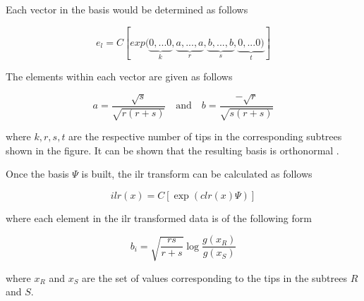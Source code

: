 Each vector in the basis would be determined as follows

\[e_l = C[exp( \underbrace{0,...0}_{k}, \underbrace{a,...,a}_{r},\underbrace{b,...,b}_s,\underbrace{0,...0)}_t]\]

The elements within each vector are given as follows

\[a = \frac{\sqrt{s}}{\sqrt{r(r+s)}} \quad \textrm{and} \quad b = \frac{-\sqrt{r}}{\sqrt{s(r+s)}}\]

where $k, r, s, t$ are the respective number of tips in the corresponding subtrees shown in the figure.  It can be shown that the resulting basis is orthonormal \cite{groups_of_parts}.

Once the basis $\Psi$ is built, the ilr transform can be calculated as follows

\[
ilr(x) = C[\exp(clr(x) \Psi)]
\]


where each element in the ilr transformed data is of the following form


\[
b_i = \sqrt{\frac{rs}{r+s}} \log \frac{g(x_R)}{g(x_S)}
\]

where $ x_R$ and $ x_S$ are the set of values corresponding to the tips in the subtrees $R$ and $S$.
